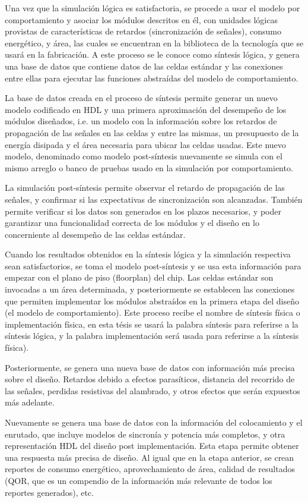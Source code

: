 Una vez que la simulación lógica es satisfactoria, se procede a usar el modelo por comportamiento y asociar los módulos descritos en él, con unidades lógicas provistas de características de retardos (sincronización de señales), consumo energético, y área, las cuales se encuentran en la biblioteca de la tecnología que se usará en la fabricación. A este proceso se le conoce como síntesis lógica, y genera una base de datos que contiene datos de las celdas estándar y las conexiones entre ellas para ejecutar las funciones abstraídas del modelo de comportamiento.

La base de datos creada en el proceso de síntesis permite generar un nuevo modelo codificado en HDL y una primera aproximación del desempeño de los módulos diseñados, i.e. un modelo con la información sobre los retardos de propagación de las señales en las celdas y entre las mismas, un presupuesto de la energía disipada y el área necesaria para ubicar las celdas usadas. Este nuevo modelo, denominado como modelo post-síntesis nuevamente se simula con el mismo arreglo o banco de pruebas usado en la simulación por comportamiento.

La simulación post-síntesis permite observar el retardo de propagación de las señales, y confirmar si las expectativas de sincronización son alcanzadas. También permite verificar si los datos son generados en los plazos necesarios, y poder garantizar una funcionalidad correcta de los módulos y el diseño en lo concerniente al desempeño de las celdas estándar. 

Cuando los resultados obtenidos en la síntesis lógica y la simulación respectiva sean satisfactorios, se toma el modelo post-síntesis y se usa esta información para empezar con el plano de piso (floorplan) del chip. Las celdas estándar son invocadas a un área determinada, y posteriormente se establecen las conexiones que permiten implementar los módulos abstraídos en la primera etapa del diseño (el modelo de comportamiento). Este proceso recibe el nombre de síntesis física o implementación física, en esta tésis se usará la palabra síntesis para referirse a la síntesis lógica, y la palabra implementación será usada para referirse a la síntesis física).

Posteriormente, se genera una nueva base de datos con información más precisa sobre el diseño. Retardos debido a efectos parasíticos, distancia del recorrido de las señales, perdidas resistivas del alambrado, y otros efectos que serán expuestos más adelante.

Nuevamente se genera una base de datos con la información del colocamiento y el enrutado, que incluye modelos de sincronía y potencia más completos, y otra representación HDL del diseño post implementación. Esta etapa permite obtener una respuesta más precisa de diseño. Al igual que en la etapa anterior, se crean reportes de consumo energético, aprovechamiento de área, calidad de resultados (QOR, que es un compendio de la información más relevante de todos los reportes generados), etc.

